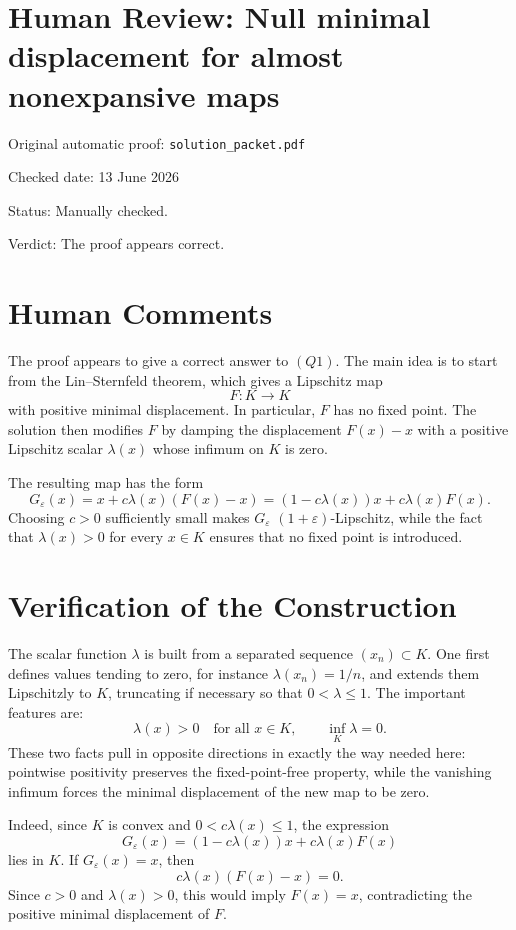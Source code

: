 \documentclass[11pt]{article}
\begin{document}
\section*{Human Review: Null minimal displacement for almost nonexpansive maps}

\noindent Original automatic proof: \texttt{solution\_packet.pdf}

\noindent Checked date: 13 June 2026

\noindent Status: Manually checked.

\noindent Verdict: The proof appears correct.

\section*{Human Comments}

The proof appears to give a correct answer to \((Q1)\). The main idea is to
start from the Lin--Sternfeld theorem, which gives a Lipschitz map
\[
  F:K\to K
\]
with positive minimal displacement. In particular, \(F\) has no fixed point.
The solution then modifies \(F\) by damping the displacement \(F(x)-x\) with a
positive Lipschitz scalar \(\lambda(x)\) whose infimum on \(K\) is zero.

The resulting map has the form
\[
  G_\varepsilon(x)
  =
  x+c\lambda(x)(F(x)-x)
  =
  (1-c\lambda(x))x+c\lambda(x)F(x).
\]
Choosing \(c>0\) sufficiently small makes \(G_\varepsilon\)
\((1+\varepsilon)\)-Lipschitz, while the fact that \(\lambda(x)>0\) for every
\(x\in K\) ensures that no fixed point is introduced.

\section*{Verification of the Construction}

The scalar function \(\lambda\) is built from a separated sequence
\((x_n)\subset K\). One first defines values tending to zero, for instance
\(\lambda(x_n)=1/n\), and extends them Lipschitzly to \(K\), truncating if
necessary so that \(0<\lambda\leq1\). The important features are:
\[
  \lambda(x)>0\quad\text{for all }x\in K,
  \qquad
  \inf_K\lambda=0.
\]
These two facts pull in opposite directions in exactly the way needed here:
pointwise positivity preserves the fixed-point-free property, while the
vanishing infimum forces the minimal displacement of the new map to be zero.

Indeed, since \(K\) is convex and \(0<c\lambda(x)\leq1\), the expression
\[
  G_\varepsilon(x)=(1-c\lambda(x))x+c\lambda(x)F(x)
\]
lies in \(K\). If \(G_\varepsilon(x)=x\), then
\[
  c\lambda(x)(F(x)-x)=0.
\]
Since \(c>0\) and \(\lambda(x)>0\), this would imply \(F(x)=x\), contradicting
the positive minimal displacement of \(F\).
\end{document}
